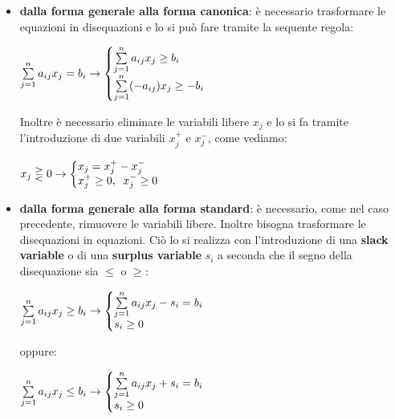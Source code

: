 \documentclass[11pt]{book}
\makeatletter
\newenvironment{sistema}%
{\left\lbrace\begin{array}{@{}l@{}}}%
{\end{array}\right.}
\makeatother
\begin{document}
\begin{itemize}
  
\item {\bf dalla forma generale alla forma canonica}: \`e necessario
  trasformare le equazioni in disequazioni e lo si pu\`o fare tramite
  la sequente regola:
  \begin{center}
  $\sum\limits_{j=1}^{n}a_{ij}x_j = b_i \rightarrow 
  \begin{sistema} 
    \sum\limits_{j=1}^n a_{ij}x_j \geq b_i\\
    \sum\limits_{j=1}^n (-a_{ij})x_j \geq -b_i\\
  \end{sistema}
  $
  \end{center}
  Inoltre \`e necessario eliminare le variabili libere $x_j$ e lo si
  fa tramite l'introduzione di due variabili $x_j^+$ e $x_j^-$, come
  vediamo:
  \begin{center}
  $x_j \gtreqless 0 \rightarrow 
  \begin{sistema}
    x_j = x_j^+ - x_j^- \\
    x_j^+ \geq 0,\phantom{a}x_j^-\geq 0
  \end{sistema}
  $
  \end{center}

\item {\bf dalla forma generale alla forma standard}: \`e necessario,
  come nel caso precedente, rimuovere le variabili libere. Inoltre
  bisogna trasformare le disequazioni in equazioni. Ci\`o lo si
  realizza con l'introduzione di una {\bf slack variable} o di una
  {\bf surplus variable} $s_i$ a seconda che il segno della disequazione sia
  $\leq$ o $\geq$:

  \begin{center}
  $\sum\limits_{j=1}^n a_{ij}x_j \geq b_i \rightarrow
  \begin{sistema}
    \sum\limits_{j=1}^n a_{ij}x_j - s_i = b_i \\
    s_i \geq 0
  \end{sistema}
  $
  \end{center}

  oppure:

  \begin{center}
  $\sum\limits_{j=1}^n a_{ij}x_j \leq b_i \rightarrow
  \begin{sistema}
    \sum\limits_{j=1}^n a_{ij}x_j + s_i = b_i \\
    s_i \geq 0
  \end{sistema}
  $
  \end{center}

\end{itemize}
\end{document}
